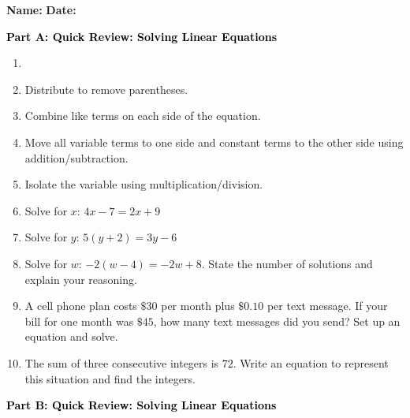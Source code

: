 \documentclass[12pt, letterpaper, fleqn]{article}
\begin{document}
\textbf{Name:} \underline{\hspace{5cm}}
\hfill
\textbf{Date:} \underline{\hspace{3cm}}\\

\vspace{5mm}

\begin{tcolorbox}[colback=customteal!20]
\large\textcolor{black}{\textbf{Part A: Quick Review: Solving Linear Equations}}
\end{tcolorbox}

\vspace{3mm}

\begin{enumerate}[itemsep=4.2cm, leftmargin=0.6cm]
\item [label=\alph*., itemsep=0.2em]
\item Distribute to remove parentheses.
\item Combine like terms on each side of the equation.
\item Move all variable terms to one side and constant terms to the other side using addition/subtraction.
\item Isolate the variable using multiplication/division.
\item Solve for $x$: $4x - 7 = 2x + 9$
\vspace{2cm} %
\item Solve for $y$: $5(y + 2) = 3y - 6$
\vspace{2cm}
\item Solve for $w$: $-2(w - 4) = -2w + 8$. State the number of solutions and explain your reasoning.
\vspace{2cm}
\item A cell phone plan costs $\$30$ per month plus $\$0.10$ per text message. If your bill for one month was $\$45$, how many text messages did you send? Set up an equation and solve.
\vspace{2cm}
\item The sum of three consecutive integers is $72$. Write an equation to represent this situation and find the integers.
\vspace{2cm}
\end{enumerate}

\newpage

\begin{tcolorbox}[colback=customteal!20]
\large\textcolor{black}{\textbf{Part B: Quick Review: Solving Linear Equations}}
\end{tcolorbox}
\end{document}
